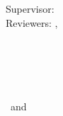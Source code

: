 \begin{titlepage}
	
	\centering
	\thesisDate \\
	
\end{titlepage}


\hfill
\vfill
{
	\small
	\textbf{\thesisAuthor} \\
	\textit{\thesisTitle} \\
	\thesisDate \\
	Supervisor: \thesisSupervisorTitle\ \thesisSupervisor\\
	Reviewers: \thesisSupervisor, \thesisReviewerOne \\
	[1.5em]
	\textbf{\thesisUniversity} \\
	\thesisUniversityInstitute \\
	\thesisUniversityDepartment \\
	\thesisUniversityGroup \\
	\thesisUniversityCity
	\thesisUniversityStreetAddress \\
	\thesisUniversityPostalCode\ and \thesisUniversityCity
}
